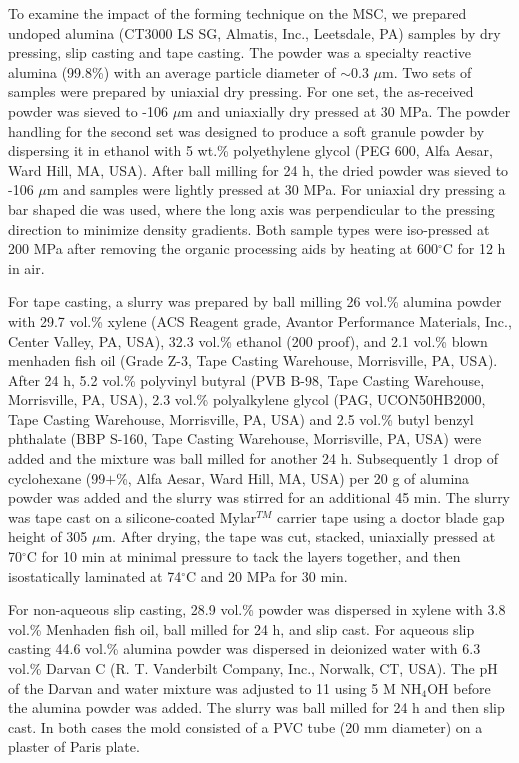 To examine the impact of the forming technique on the MSC, we prepared undoped alumina (CT3000 LS SG, Almatis, Inc., Leetsdale, PA) samples by dry pressing, slip casting and tape casting. The powder was a specialty reactive alumina (99.8\%) with an average particle diameter of $\sim$0.3 $\mu$m. Two sets of samples were prepared by uniaxial dry pressing. For one set, the as-received powder was sieved to -106 $\mu$m and uniaxially dry pressed at 30 MPa. The powder handling for the second set was designed to produce a soft granule powder by dispersing it in ethanol with 5 wt.\% polyethylene glycol (PEG 600, Alfa Aesar, Ward Hill, MA, USA). After ball milling for 24 h, the dried powder was sieved to -106 $\mu$m and samples were lightly pressed at 30 MPa. For uniaxial dry pressing a bar shaped die was used, where the long axis was perpendicular to the pressing direction to minimize density gradients. Both sample types were iso-pressed at 200 MPa after removing the organic processing aids by heating at 600$^{\circ}$C for 12 h in air.

For tape casting, a slurry was prepared by ball milling 26 vol.\% alumina powder with 29.7 vol.\% xylene (ACS Reagent grade, Avantor Performance Materials, Inc., Center Valley, PA, USA), 32.3 vol.\% ethanol (200 proof), and 2.1 vol.\% blown menhaden fish oil (Grade Z-3, Tape Casting Warehouse, Morrisville, PA, USA). After 24 h, 5.2 vol.\% polyvinyl butyral (PVB B-98, Tape Casting Warehouse, Morrisville, PA, USA), 2.3 vol.\% polyalkylene glycol (PAG, UCON50HB2000, Tape Casting Warehouse, Morrisville, PA, USA) and 2.5 vol.\% butyl benzyl phthalate (BBP S-160, Tape Casting Warehouse, Morrisville, PA, USA) were added and the mixture was ball milled for another 24 h. Subsequently 1 drop of cyclohexane (99$+$\%, Alfa Aesar, Ward Hill, MA, USA) per 20 g of alumina powder was added and the slurry was stirred for an additional 45 min. The slurry was tape cast on a silicone-coated Mylar$^{TM}$ carrier tape using a doctor blade gap height of 305 $\mu$m. After drying, the tape was cut, stacked, uniaxially pressed at 70$^{\circ}$C for 10 min at minimal pressure to tack the layers together, and then isostatically laminated at 74$^{\circ}$C and 20 MPa for 30 min.

For non-aqueous slip casting, 28.9 vol.\% powder was dispersed in xylene with 3.8 vol.\% Menhaden fish oil, ball milled for 24 h, and slip cast. For aqueous slip casting 44.6 vol.\% alumina powder was dispersed in deionized water with 6.3 vol.\% Darvan C (R. T. Vanderbilt Company, Inc., Norwalk, CT, USA). The pH of the Darvan and water mixture was adjusted to 11 using 5 M NH$_{4}$OH before the alumina powder was added. The slurry was ball milled for 24 h and then slip cast. In both cases the mold consisted of a PVC tube (20 mm diameter) on a plaster of Paris plate.

